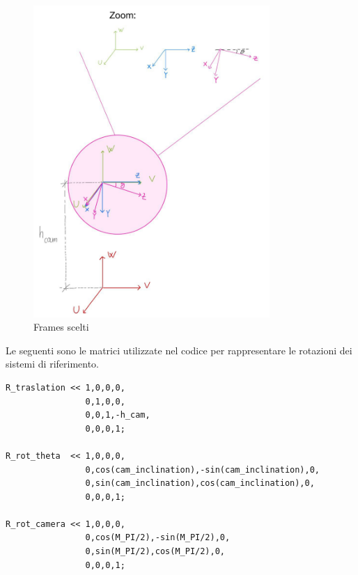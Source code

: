 \begin{figure}[H]
	\centering
	\includegraphics[width=0.8\textwidth]{Immagini/frames.jpg}
	\caption{Frames scelti}
	\label{fig:frames}
\end{figure}


Le seguenti sono le matrici utilizzate nel codice per rappresentare le rotazioni dei sistemi di riferimento.
\begin{lstlisting}
R_traslation << 1,0,0,0,
				0,1,0,0,
				0,0,1,-h_cam,
				0,0,0,1;

R_rot_theta  << 1,0,0,0,
				0,cos(cam_inclination),-sin(cam_inclination),0,
				0,sin(cam_inclination),cos(cam_inclination),0,
				0,0,0,1;

R_rot_camera << 1,0,0,0,
				0,cos(M_PI/2),-sin(M_PI/2),0,
				0,sin(M_PI/2),cos(M_PI/2),0,
				0,0,0,1;
\end{lstlisting}
